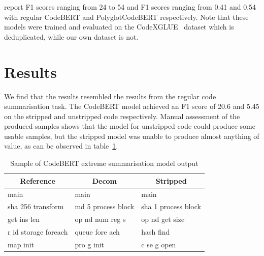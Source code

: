 \citeauthor{PolyglotCodeBERT} report F1 scores ranging from 24 to 54 and F1 scores ranging from 0.41 and 0.54 with regular CodeBERT and PolyglotCodeBERT respectively. Note that these models were trained and evaluated on the CodeXGLUE~\cite{CodeXGlue} dataset which is deduplicated, while our own dataset is not. %

\section{Results}
We find that the results resembled the results from the regular code summarisation task. The CodeBERT model achieved an F1 score of 20.6 and 5.45 on the stripped and unstripped code respectively. Manual assessment of the produced samples shows that the model for unstripped code could produce some usable samples, but the stripped model was unable to produce almost anything of value, as can be observed in table~\ref{fig:extremesumex}.

\begin{table}[tbh]
\begin{tabular}{l|ll}
\multicolumn{1}{c|}{Reference} & \multicolumn{1}{c}{Decom} & \multicolumn{1}{c}{Stripped} \\ \hline
main                           & main                      & main                         \\
sha 256 transform              & md 5  process  block      & sha 1  process  block        \\
get ins len                    & op nd  num  reg s         & op nd  get  size             \\
r id storage foreach           & queue  fore ach           & hash  find                   \\
map init                       & pro g  init               & c se g  open                
\end{tabular}
\caption{Sample of CodeBERT extreme summarisation model output}
\label{fig:extremesumex}
\end{table}
